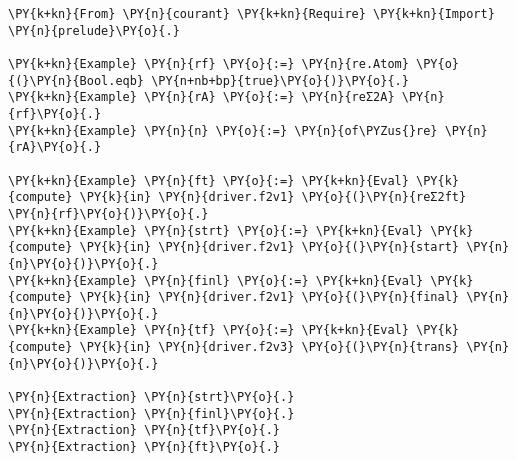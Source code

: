 {\scriptsize
\begin{Verbatim}[commandchars=\\\{\}]
\PY{k+kn}{From} \PY{n}{courant} \PY{k+kn}{Require} \PY{k+kn}{Import} \PY{n}{prelude}\PY{o}{.}

\PY{k+kn}{Example} \PY{n}{rf} \PY{o}{:=} \PY{n}{re.Atom} \PY{o}{(}\PY{n}{Bool.eqb} \PY{n+nb+bp}{true}\PY{o}{)}\PY{o}{.}
\PY{k+kn}{Example} \PY{n}{rA} \PY{o}{:=} \PY{n}{reΣ2A} \PY{n}{rf}\PY{o}{.}
\PY{k+kn}{Example} \PY{n}{n} \PY{o}{:=} \PY{n}{of\PYZus{}re} \PY{n}{rA}\PY{o}{.}

\PY{k+kn}{Example} \PY{n}{ft} \PY{o}{:=} \PY{k+kn}{Eval} \PY{k}{compute} \PY{k}{in} \PY{n}{driver.f2v1} \PY{o}{(}\PY{n}{reΣ2ft} \PY{n}{rf}\PY{o}{)}\PY{o}{.}
\PY{k+kn}{Example} \PY{n}{strt} \PY{o}{:=} \PY{k+kn}{Eval} \PY{k}{compute} \PY{k}{in} \PY{n}{driver.f2v1} \PY{o}{(}\PY{n}{start} \PY{n}{n}\PY{o}{)}\PY{o}{.}
\PY{k+kn}{Example} \PY{n}{finl} \PY{o}{:=} \PY{k+kn}{Eval} \PY{k}{compute} \PY{k}{in} \PY{n}{driver.f2v1} \PY{o}{(}\PY{n}{final} \PY{n}{n}\PY{o}{)}\PY{o}{.}
\PY{k+kn}{Example} \PY{n}{tf} \PY{o}{:=} \PY{k+kn}{Eval} \PY{k}{compute} \PY{k}{in} \PY{n}{driver.f2v3} \PY{o}{(}\PY{n}{trans} \PY{n}{n}\PY{o}{)}\PY{o}{.}

\PY{n}{Extraction} \PY{n}{strt}\PY{o}{.}
\PY{n}{Extraction} \PY{n}{finl}\PY{o}{.}
\PY{n}{Extraction} \PY{n}{tf}\PY{o}{.}
\PY{n}{Extraction} \PY{n}{ft}\PY{o}{.}
\end{Verbatim}
}
